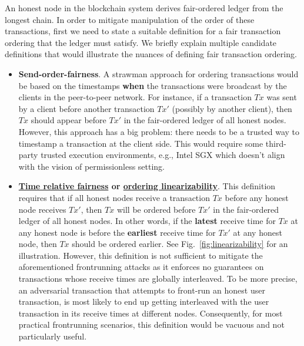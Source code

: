\documentclass{article}
\begin{document}
An honest node in the blockchain system derives fair-ordered ledger from the longest chain. In order to mitigate manipulation of the order of these transactions, first we need to state a suitable definition for a fair transaction ordering that the ledger must satisfy. We briefly explain multiple candidate definitions that would illustrate the nuances of defining fair transaction ordering. 
\begin{itemize}
    \item \textbf{Send-order-fairness}. A strawman approach for ordering transactions would be based on the timestamps \textbf{when} the transactions were broadcast by the clients in the peer-to-peer network.  For instance, if a transaction $Tx$ was sent by a client before another transaction $Tx'$ (possibly by another client), then $Tx$ should appear before $Tx'$ in the fair-ordered ledger of all honest nodes. However, this approach has a big problem: there needs to be a trusted way to timestamp a transaction at the client side. This would require some third-party trusted execution environments, e.g., Intel SGX which doesn't align with the vision of permissionless setting.  
    \item \textbf{\href{https://arxiv.org/abs/2007.08303}{Time relative fairness} or \href{https://www.usenix.org/conference/osdi20/presentation/zhang-yunhao}{ordering linearizability}}.  This definition requires that if all honest nodes receive a transaction $Tx$ before any honest node receives $Tx'$, then $Tx$ will be ordered before $Tx'$ in the fair-ordered ledger of all honest nodes. In other words, if the \textbf{latest} receive time for $Tx$ at any honest node is before the \textbf{earliest} receive time for $Tx'$ at any honest node, then $Tx$ should be ordered earlier. See Fig.~\ref{fig:linearizability} for an illustration. However, this definition is not sufficient to mitigate the aforementioned frontrunning attacks as it enforces no guarantees on transactions whose receive times are globally interleaved. To be more precise, an adversarial transaction that attempts to front-run an honest user transaction, is most likely to end up getting interleaved with the user transaction in its receive times at different nodes.  Consequently, for most practical frontrunning scenarios, this definition would be vacuous and not particularly useful.

\end{itemize}
\end{document}
